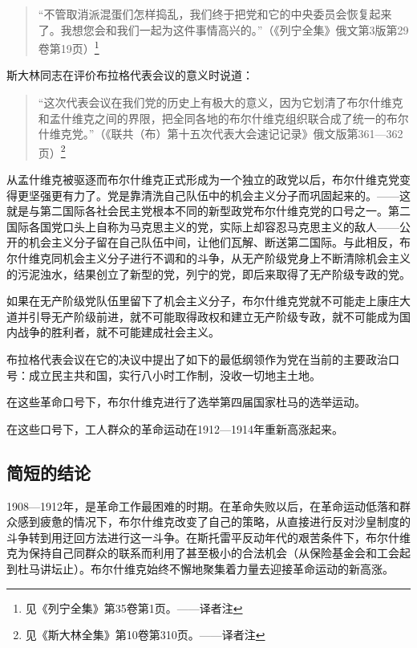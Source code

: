 \begin{quotation}
“不管取消派混蛋们怎样捣乱，我们终于把党和它的中央委员会恢复起来了。我想您会和我们一起为这件事情高兴的。”（《列宁全集》俄文第3版第29卷第19页）\footnote{见《列宁全集》第35卷第1页。——译者注}
\end{quotation}

斯大林同志在评价布拉格代表会议的意义时说道：

\begin{quotation}
“这次代表会议在我们党的历史上有极大的意义，因为它划清了布尔什维克和孟什维克之间的界限，把全同各地的布尔什维克组织联合成了统一的布尔什维克党。”（《联共（布）第十五次代表大会速记记录》俄文版第361—362页）\footnote{见《斯大林全集》第10卷第310页。——译者注}
\end{quotation}

从孟什维克被驱逐而布尔什维克正式形成为一个独立的政党以后，布尔什维克党变得更坚强更有力了。党是靠清洗自己队伍中的机会主义分子而巩固起来的。——这就是与第二国际各社会民主党根本不同的新型政党布尔什维克党的口号之一。第二国际各国党口头上自称为马克思主义的党，实际上却容忍马克思主义的敌人——公开的机会主义分子留在自己队伍中间，让他们瓦解、断送第二国际。与此相反，布尔什维克同机会主义分子进行不调和的斗争，从无产阶级党身上不断清除机会主义的污泥浊水，结果创立了新型的党，列宁的党，即后来取得了无产阶级专政的党。

如果在无产阶级党队伍里留下了机会主义分子，布尔什维克党就不可能走上康庄大道并引导无产阶级前进，就不可能取得政权和建立无产阶级专政，就不可能成为国内战争的胜利者，就不可能建成社会主义。

布拉格代表会议在它的决议中提出了如下的最低纲领作为党在当前的主要政治口号：成立民主共和国，实行八小时工作制，没收一切地主土地。

在这些革命口号下，布尔什维克进行了选举第四届国家杜马的选举运动。

在这些口号下，工人群众的革命运动在1912—1914年重新高涨起来。


\subsection{简短的结论}

1908—1912年，是革命工作最困难的时期。在革命失败以后，在革命运动低落和群众感到疲惫的情况下，布尔什维克改变了自己的策略，从直接进行反对沙皇制度的斗争转到用迂回方法进行这一斗争。在斯托雷平反动年代的艰苦条件下，布尔什维克为保持自己同群众的联系而利用了甚至极小的合法机会（从保险基金会和工会起到杜马讲坛止）。布尔什维克始终不懈地聚集着力量去迎接革命运动的新高涨。

